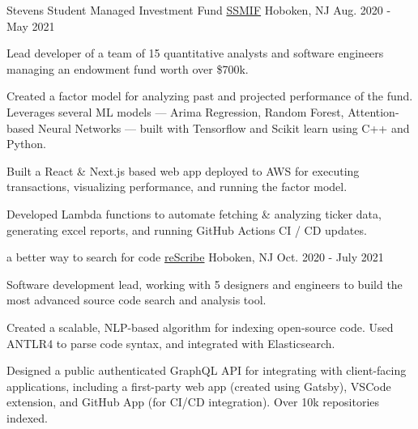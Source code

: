 

\begin{cventries}

  \cventry
  {Stevens Student Managed Investment Fund} %
  {\href{https://bailey.ssmif.com}{SSMIF}} %
  {Hoboken, NJ} %
  {Aug. 2020 - May 2021} %
  {
    \begin{cvitems} %
      \item {Lead developer of a team of 15 quantitative analysts and software engineers managing an endowment fund worth over \$700k.}
      \item {Created a factor model for analyzing past and projected performance of the fund. Leverages several ML models --- Arima Regression, Random Forest, Attention-based Neural Networks --- built with Tensorflow and Scikit learn using C++ and Python.}
      \item {Built a React \& Next.js based web app deployed to AWS for executing transactions, visualizing performance, and running the factor model.}
      \item {Developed Lambda functions to automate fetching \& analyzing ticker data, generating excel reports, and running GitHub Actions CI / CD updates.}
    \end{cvitems}
  }

  \cventry
  {a better way to search for code} %
  {\href{https://rescribe.dev}{reScribe}} %
  {Hoboken, NJ} %
  {Oct. 2020 - July 2021} %
  {
    \begin{cvitems} %
      \item {Software development lead, working with 5 designers and engineers to build the most advanced source code search and analysis tool.}
      \item {Created a scalable, NLP-based algorithm for indexing open-source code. Used ANTLR4 to parse code syntax, and integrated with Elasticsearch.}
      \item {Designed a public authenticated GraphQL API for integrating with client-facing applications, including a first-party web app (created using Gatsby), VSCode extension, and GitHub App (for CI/CD integration). Over 10k repositories indexed.}
    \end{cvitems}
  }


\end{cventries}
